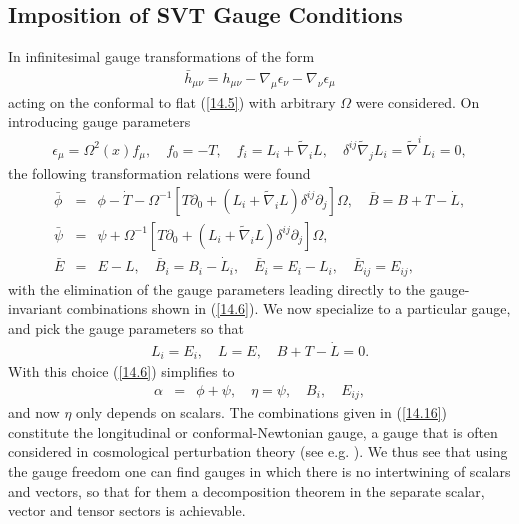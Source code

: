 \subsection{Imposition of SVT Gauge Conditions}
\label{ss:taking_advantage_gauge_freedom}

In \cite{amarasinghe_2019} infinitesimal gauge transformations of the form 
%
\begin{eqnarray}
\bar{h}_{\mu\nu}=h_{\mu\nu}-\nabla _{\mu}\epsilon_{\nu}-\nabla _{\nu}\epsilon_{\mu}
\label{14.12}
\end{eqnarray}
% 
acting on the conformal to flat (\ref{14.5}) with arbitrary $\Omega$ were considered. On introducing gauge parameters
%
\begin{eqnarray}
\epsilon_{\mu}=\Omega^2(x)f_{\mu},\quad f_{0}=-T,\quad f_i=L_i+\tilde{\nabla}_iL,\quad \delta^{ij}\tilde{\nabla}_jL_i=\tilde{\nabla}^iL_i=0,
\label{14.13}
\end{eqnarray}
%
the following transformation relations were found
%
\begin{eqnarray}
\bar{\phi}&=&\phi-\dot{T}-\Omega^{-1}[T\partial_0+(L_i+\tilde{\nabla}_iL)\delta^{ij}\partial_j]\Omega,\quad \bar{B}=B+T-\dot{L},
\nonumber\\
\bar{\psi}&=&\psi+\Omega^{-1}[T\partial_0+(L_i+\tilde{\nabla}_iL)\delta^{ij}\partial_j]\Omega,
\nonumber\\
\bar{E}&=&E-L,\quad \bar{B}_i=B_i-\dot{L}_i,\quad \bar{E}_i=E_i-L_i, \quad \bar{E}_{ij}=E_{ij},
\label{14.14}
\end{eqnarray}
%
with the elimination of the gauge parameters leading directly to the gauge-invariant combinations shown in (\ref{14.6}). We now specialize to a particular gauge, and pick the gauge parameters so that 
%
\begin{eqnarray}
L_i=E_i,\quad L=E, \quad B+T-\dot{L}=0.
\label{14.15}
\end{eqnarray}
%
With this choice (\ref{14.6}) simplifies to
%
\begin{eqnarray}
\alpha &=& \phi +\psi, \quad \eta=\psi ,\quad B_i,\quad E_{ij},
\label{14.16}
\end{eqnarray}
%
and now $\eta$ only depends on scalars. The combinations given in (\ref{14.16}) constitute the longitudinal or conformal-Newtonian gauge, a gauge that is often considered in cosmological perturbation theory (see e.g. \cite{mukhanov_1992, bertschinger_2000}). We thus see that using the gauge freedom one can find gauges in which there is no intertwining of scalars and vectors, so that for them a decomposition theorem in the separate scalar, vector and tensor sectors is achievable.